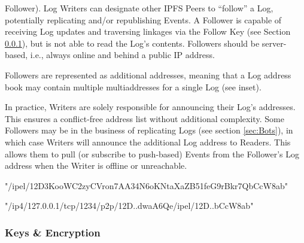 \documentclass{comjnl}
\begin{document}
\begin{definition}Follower). Log Writers can designate other IPFS Peers to “follow” a Log, potentially replicating and/or republishing Events. A Follower is capable of receiving Log updates and traversing linkages via the Follow Key (see Section  \ref{sec:KeysEncryption}), but is not able to read the Log’s contents. Followers should be server-based, i.e., always online and behind a public IP address.\end{definition}

Followers are represented as additional addresses, meaning that a Log address book may contain multiple multiaddresses for a single Log (see inset).

In practice, Writers are solely responsible for announcing their Log’s addresses. This ensures a conflict-free address list without additional complexity. Some Followers may be in the business of replicating Logs (see section  \ref{sec:Bots}), in which case Writers will announce the additional Log address to Readers. This allows them to pull (or subscribe to push-based) Events from the Follower’s Log address when the Writer is offline or unreachable.

\begin{strip}
\begin{tcolorbox}[title=Log Multiaddress]
"/ipel/12D3KooWC2zyCVron7AA34N6oKNtaXaZB51feG9rBkr7QbCcW8ab"
\end{tcolorbox}
\end{strip}

\begin{strip}
\begin{tcolorbox}[title=Log IPEL Multiaddress]
"/ip4/127.0.0.1/tcp/1234/p2p/12D..dwaA6Qe/ipel/12D..bCcW8ab"
\end{tcolorbox}
\end{strip}

\begin{strip}
\begin{tcolorbox}
\end{tcolorbox}
\end{strip}

\subsubsection{Keys \& Encryption} \label{sec:KeysEncryption}
\end{document}
